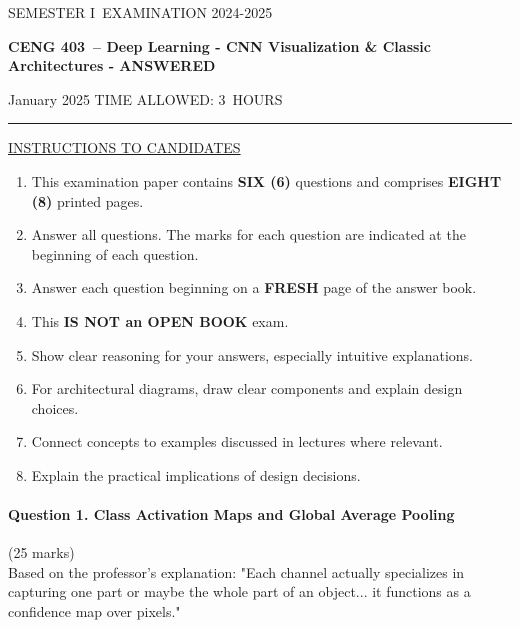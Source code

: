\documentclass[12pt]{article}
\newcommand{\masunitnumber}{CENG 403}
\newcommand{\examdate}{January 2025}
\newcommand{\academicyear}{2024-2025}
\newcommand{\semester}{I}
\newcommand{\coursename}{Deep Learning - CNN Visualization \& Classic Architectures - ANSWERED}
\newcommand{\numberofhours}{3}
\begin{document}
\setlength{\headsep}{5truemm}
\setlength{\headheight}{14.5truemm}
\setlength{\voffset}{-0.45truein}
\renewcommand{\headrulewidth}{0.0pt}
\begin{center}
SEMESTER \semester\ EXAMINATION \academicyear
\end{center}
\begin{center}
{\bf \masunitnumber\ -- \coursename}
\end{center}
\vspace{20truemm}
\noindent \examdate\hspace{45truemm} TIME ALLOWED: \numberofhours\ HOURS
\vspace{19truemm}
\hrule
\vspace{19truemm}
\noindent\underline{INSTRUCTIONS TO CANDIDATES}
\vspace{8truemm}
\begin{enumerate}
\item This examination paper contains {\bf SIX (6)} questions and comprises 
{\bf EIGHT (8)} printed pages.
\item Answer all questions. 
The marks for each question are indicated at the beginning of each question.
\item Answer each question beginning on a {\bf FRESH} page of the answer book.
\item This {\bf IS NOT an OPEN BOOK} exam.
\item Show clear reasoning for your answers, especially intuitive explanations.
\item For architectural diagrams, draw clear components and explain design choices.
\item Connect concepts to examples discussed in lectures where relevant.
\item Explain the practical implications of design decisions.
\end{enumerate}
\newpage
\lhead{}
\rhead{\masunitnumber}
\chead{}
\lfoot{}
\cfoot{\thepage}
\rfoot{}
\setlength{\footskip}{45pt}

\paragraph{Question 1. Class Activation Maps and Global Average Pooling}{\hfill (25 marks)}\\
Based on the professor's explanation: "Each channel actually specializes in capturing one part or maybe the whole part of an object... it functions as a confidence map over pixels."
\end{document}
